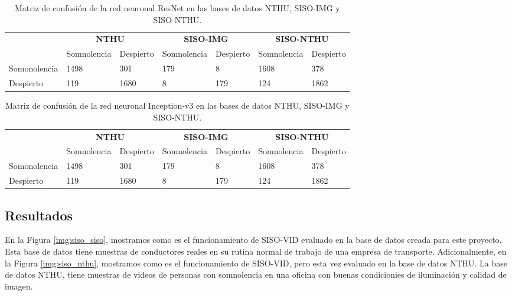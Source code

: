 \documentclass{article}
\begin{document}
\begin{table}[H]
	\centering		
	\caption{Matriz de confusión de la red neuronal ResNet en las bases de datos NTHU, SISO-IMG y SISO-NTHU.}
	\label{tab:comp3}
	\begin{tabular}{ p{1.9cm} p{2cm} p{1.6cm} p{1.9cm} p{1.6cm} p{1.9cm} p{1.6cm}}
		\hline 
		& \multicolumn{2}{c}{\textbf{NTHU}} & \multicolumn{2}{c}{\textbf{SISO-IMG}} &  \multicolumn{2}{c}{\textbf{SISO-NTHU}} \\
		& Somnolencia & Despierto & Somnolencia & Despierto & Somnolencia & Despierto  \\
		\hline 
		Somonolencia & 1498 & 301 		& 179 & 8 		& 1608 & 378 \\
		Despierto & 119 & 1680 	& 8 & 179  	    & 124 & 1862	\\	
		\hline 
	\end{tabular}
\end{table}

\begin{table}[H]
	\centering		
	\caption{Matriz de confusión de la red neuronal Inception-v3 en las bases de datos NTHU, SISO-IMG y SISO-NTHU.}
	\label{tab:comp4}
	\begin{tabular}{ p{1.9cm} p{2cm} p{1.6cm} p{1.9cm} p{1.6cm} p{1.9cm} p{1.6cm}}
		\hline 
		& \multicolumn{2}{c}{\textbf{NTHU}} & \multicolumn{2}{c}{\textbf{SISO-IMG}} &  \multicolumn{2}{c}{\textbf{SISO-NTHU}} \\
		& Somnolencia & Despierto & Somnolencia & Despierto & Somnolencia & Despierto  \\
		\hline 
		Somonolencia & 1498 & 301 		& 179 & 8 		& 1608 & 378 \\
		Despierto & 119 & 1680 	& 8 & 179  	    & 124 & 1862	\\	
		\hline 
	\end{tabular}
\end{table}

	\subsection{Resultados}
	
	En la Figura \ref{img:siso_siso}, mostramos como es el funcionamiento de SISO-VID evaluado en la base de datos creada para este proyecto. Esta base de datos tiene muestras de conductores reales en su rutina normal de trabajo de una empresa de transporte. Adicionalmente, en la Figura \ref{img:siso_nthu}, mostramos como es el funcionamiento de SISO-VID, pero esta vez evaluado en la base de datos NTHU. La base de datos NTHU, tiene muestras de videos de personas con somnolencia en una oficina con buenas condicionies de iluminación y calidad de imagen.\\
	
\end{document}
